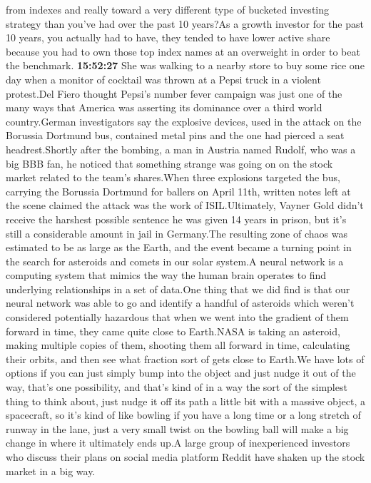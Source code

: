 \documentclass{article}%
\begin{document}
from indexes and really toward a very different type of bucketed investing strategy than you've had over the past 10 years?As a growth investor for the past 10 years, you actually had to have, they tended to have lower active share because you had to own those top index names at an overweight in order to beat the benchmark.%
\textbf{15:52:27}%
\newline%
She was walking to a nearby store to buy some rice one day when a monitor of cocktail was thrown at a Pepsi truck in a violent protest.Del Fiero thought Pepsi's number fever campaign was just one of the many ways that America was asserting its dominance over a third world country.German investigators say the explosive devices, used in the attack on the Borussia Dortmund bus, contained metal pins and the one had pierced a seat headrest.Shortly after the bombing, a man in Austria named Rudolf, who was a big BBB fan, he noticed that something strange was going on on the stock market related to the team's shares.When three explosions targeted the bus, carrying the Borussia Dortmund for ballers on April 11th, written notes left at the scene claimed the attack was the work of ISIL.Ultimately, Vayner Gold didn't receive the harshest possible sentence he was given 14 years in prison, but it's still a considerable amount in jail in Germany.The resulting zone of chaos was estimated to be as large as the Earth, and the event became a turning point in the search for asteroids and comets in our solar system.A neural network is a computing system that mimics the way the human brain operates to find underlying relationships in a set of data.One thing that we did find is that our neural network was able to go and identify a handful of asteroids which weren't considered potentially hazardous that when we went into the gradient of them forward in time, they came quite close to Earth.NASA is taking an asteroid, making multiple copies of them, shooting them all forward in time, calculating their orbits, and then see what fraction sort of gets close to Earth.We have lots of options if you can just simply bump into the object and just nudge it out of the way, that's one possibility, and that's kind of in a way the sort of the simplest thing to think about, just nudge it off its path a little bit with a massive object, a spacecraft, so it's kind of like bowling if you have a long time or a long stretch of runway in the lane, just a very small twist on the bowling ball will make a big change in where it ultimately ends up.A large group of inexperienced investors who discuss their plans on social media platform Reddit have shaken up the stock market in a big way.%
\end{document}
